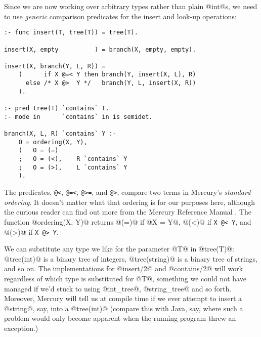 Since we are now working over arbitrary types rather than plain @int@s, we
need to use \emph{generic} comparison predicates for the insert and look-up
operations:
\begin{verbatim}
:- func insert(T, tree(T)) = tree(T).

insert(X, empty          ) = branch(X, empty, empty).

insert(X, branch(Y, L, R)) =
    (      if X @=< Y then branch(Y, insert(X, L), R)
      else /* X @>  Y */   branch(Y, L, insert(X, R))
    ).

:- pred tree(T) `contains` T.
:- mode in      `contains` in is semidet.

branch(X, L, R) `contains` Y :-
    O = ordering(X, Y),
    (   O = (=)
    ;   O = (<),    R `contains` Y
    ;   O = (>),    L `contains` Y
    ).
\end{verbatim}
The predicates, \verb!@<!, \verb!@=<!, \verb!@>=!, and \verb!@>!, 
compare two terms in Mercury's \emph{standard ordering}.
It doesn't matter what that ordering is for our purposes here, although the
curious reader can find out more from the Mercury Reference Manual
.
The function
@ordering(X, Y)@ returns @(=)@ if @X = Y@, @(<)@ if \verb!X @< Y!, and
@(>)@ if \verb!X @> Y!.

We can substitute any type we like for the parameter @T@ in @tree(T)@:
@tree(int)@ is a binary tree of integers, @tree(string)@ is a binary tree of
strings, and so on.  The implementations for @insert/2@ and @contains/2@
will work regardless of which type is substituted for @T@, something we
could not have managed if we'd stuck to using @int_tree@, @string_tree@
and so forth.
Moreover, Mercury will tell us at compile time if we ever attempt to insert
a @string@, say, into a @tree(int)@ (compare this with Java, say, where such
a problem would only become apparent when the running program threw an
exception.)

